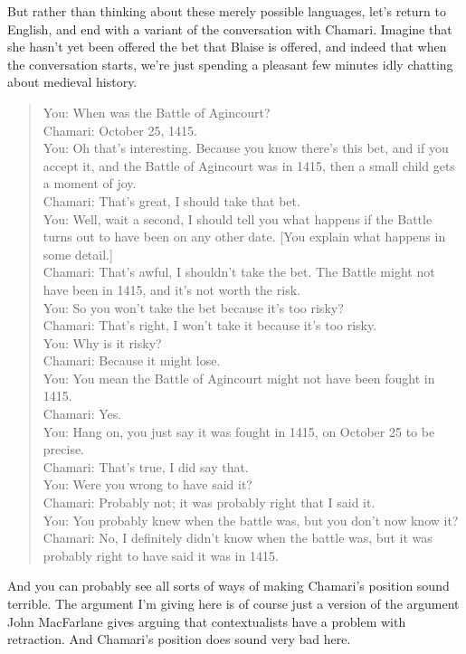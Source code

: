 \documentclass[
  11pt,
]{book}
\begin{document}
But rather than thinking about these merely possible languages, let's return to English, and end with a variant of the conversation with Chamari. Imagine that she hasn't yet been offered the bet that Blaise is offered, and indeed that when the conversation starts, we're just spending a pleasant few minutes idly chatting about medieval history.

\begin{quote}
You: When was the Battle of Agincourt?\\
Chamari: October 25, 1415.\\
You: Oh that's interesting. Because you know there's this bet, and if you accept it, and the Battle of Agincourt was in 1415, then a small child gets a moment of joy.\\
Chamari: That's great, I should take that bet.\\
You: Well, wait a second, I should tell you what happens if the Battle turns out to have been on any other date. {[}You explain what happens in some detail.{]}\\
Chamari: That's awful, I shouldn't take the bet. The Battle might not have been in 1415, and it's not worth the risk.\\
You: So you won't take the bet because it's too risky?\\
Chamari: That's right, I won't take it because it's too risky.\\
You: Why is it risky?\\
Chamari: Because it might lose.\\
You: You mean the Battle of Agincourt might not have been fought in 1415.\\
Chamari: Yes.\\
You: Hang on, you just say it was fought in 1415, on October 25 to be precise.\\
Chamari: That's true, I did say that.\\
You: Were you wrong to have said it?\\
Chamari: Probably not; it was probably right that I said it.\\
You: You probably knew when the battle was, but you don't now know it?\\
Chamari: No, I definitely didn't know when the battle was, but it was probably right to have said it was in 1415.
\end{quote}

And you can probably see all sorts of ways of making Chamari's position sound terrible. The argument I'm giving here is of course just a version of the argument John MacFarlane \citeyearpar{MacFarlane2005-Knowledge} gives arguing that contextualists have a problem with retraction. And Chamari's position does sound very bad here.
\end{document}
